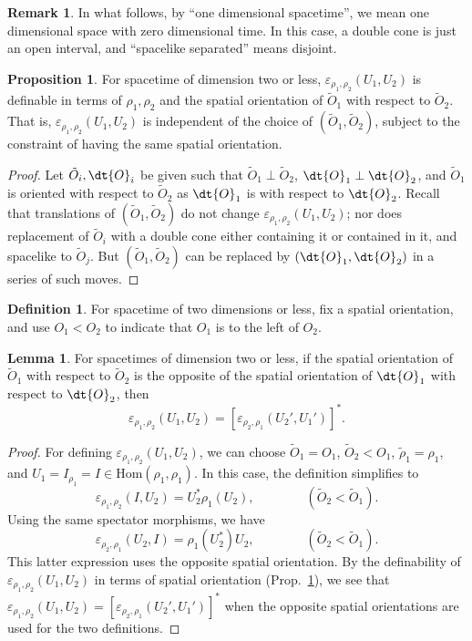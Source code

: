 \documentclass[11pt]{article}
\theoremstyle{definition}
\newtheorem{prop}[thm]{Proposition}
\newtheorem{lemma}[thm]{Lemma}
\theoremstyle{definition}
\newtheorem{defn}[thm]{Definition}
\newtheorem{note}[thm]{Remark}
\theoremstyle{remark}
\newcommand{\ve}{\varepsilon}
\def\wt#1{{\tilde #1}}
\newcommand{\Hom}{\mathrm{Hom}}
\begin{document}
\begin{note} In what follows, by ``one dimensional
  spacetime'', we mean one dimensional space with zero
  dimensional time.  In this case, a double cone is
  just an open interval, and ``spacelike separated''
  means disjoint. \end{note}

\begin{prop} For spacetime of dimension two or less,
  $\ve _{\rho _1,\rho _2}(U_1,U_2)$ is definable in
  terms of $\rho _1,\rho _2$ and the spatial
  orientation of $\wt O_1$ with respect to $\wt O_2$.
  That is, $\ve _{\rho _1,\rho _2}(U_1,U_2)$ is
  independent of the choice of $(\wt O_1,\wt O_2)$,
  subject to the constraint of having the same spatial
  orientation.  \label{orient} \end{prop}

\begin{proof} Let $\wt O_i,\dt{O}_i$ be given such that $\wt O_1\perp \wt O_2$,
  $\dt{O}_1\perp \dt{O}_2$, and $\wt O_1$ is oriented with respect to $\wt O_2$ as
  $\dt{O}_1$ is with respect to $\dt{O}_2$.  Recall that translations of $(\wt
  O_1,\wt O_2)$ do not change $\ve _{\rho _1,\rho _2}(U_1,U_2)$; nor does replacement
  of $\wt O_i$ with a double cone either containing it or contained in it, and
  spacelike to $\wt O_j$.  But $(\wt O_1,\wt O_2)$ can be replaced by
  $(\dt{O}_1,\dt{O}_2)$ in a series of such moves.
\end{proof}

\begin{defn} For spacetime of two dimensions or less, fix a spatial orientation, and
  use $O_1<O_2$ to indicate that $O_1$ is to the left of $O_2$.  \end{defn} 

\begin{lemma} For spacetimes of dimension two or less, if the spatial orientation of
  $\wt O_1$ with respect to $\wt O_2$ is the opposite of the spatial orientation of
  $\dt{O}_1$ with respect to $\dt{O}_2$, then
$$ \ve _{\rho _1,\rho _2}(U_1,U_2) =[\ve _{\rho _2,\rho _1}(U_2',U_1')]^* .$$
\end{lemma}

\begin{proof} For defining $\ve _{\rho _1,\rho _2}(U_1,U_2)$, we can choose $\wt
  O_1=O_1$, $\wt O_2<O_1$, $\wt \rho _1=\rho _1$, and $U_1=I_{\rho _1}=I\in \Hom
  (\rho _1,\rho _1)$.  In this case, the definition simplifies to
$$ \ve _{\rho _1,\rho _2}(I,U_2) = U_2^*\rho _1(U_2),\qquad
\qquad (\wt O_2<\wt O_1) .$$ Using the same spectator morphisms, we have
$$ \ve _{\rho _2,\rho _1}(U_2,I) = \rho _1(U_2^*)U_2 ,\qquad \qquad (\wt O_2<\wt
O_1). $$ This latter expression uses the opposite spatial orientation.  By the
definability of $\ve _{\rho _1,\rho _2}(U_1,U_2)$ in terms of spatial orientation
(Prop.\ \ref{orient}), we see that $\ve _{\rho _1,\rho _2}(U_1,U_2)=[\ve _{\rho
  _2,\rho _1}(U_2',U_1')]^*$ when the opposite spatial orientations are used for the
two definitions.  \end{proof}
\end{document}
